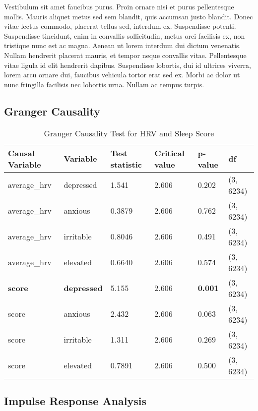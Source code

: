 \documentclass{article}
\begin{document}
Vestibulum sit amet faucibus purus. Proin ornare nisi et purus
pellentesque mollis. Mauris aliquet metus sed sem blandit, quis accumsan
justo blandit. Donec vitae lectus commodo, placerat tellus sed, interdum
ex. Suspendisse potenti. Suspendisse tincidunt, enim in convallis
sollicitudin, metus orci facilisis ex, non tristique nunc est ac magna.
Aenean ut lorem interdum dui dictum venenatis. Nullam hendrerit placerat
mauris, et tempor neque convallis vitae. Pellentesque vitae ligula id
elit hendrerit dapibus. Suspendisse lobortis, dui id ultrices viverra,
lorem arcu ornare dui, faucibus vehicula tortor erat sed ex. Morbi ac
dolor ut nunc fringilla facilisis nec lobortis urna. Nullam ac tempus
turpis.

\hypertarget{granger-causality-1}{%
\subsection{Granger Causality}\label{granger-causality-1}}

\begin{table}[!ht]
    \centering
    \begin{tabular}{llllll}
    \toprule
        \textbf{Causal Variable} & \textbf{Variable} & \textbf{Test statistic} & \textbf{Critical value} & \textbf{p-value} & \textbf{df} \\ \midrule
        average\_hrv & depressed & 1.541 & 2.606 & 0.202 & (3, 6234) \\ 
        average\_hrv & anxious & 0.3879 & 2.606 & 0.762 & (3, 6234) \\ 
        average\_hrv & irritable & 0.8046 & 2.606 & 0.491 & (3, 6234) \\ 
        average\_hrv & elevated & 0.6640 & 2.606 & 0.574 & (3, 6234) \\ 
        \textbf{score} & \textbf{depressed} & 5.155 & 2.606 & \textbf{0.001} & (3, 6234) \\ 
        score & anxious & 2.432 & 2.606 & 0.063 & (3, 6234) \\ 
        score & irritable & 1.311 & 2.606 & 0.269 & (3, 6234) \\ 
        score & elevated & 0.7891 & 2.606 & 0.500 & (3, 6234) \\ \bottomrule
    \end{tabular}
    \caption{Granger Causality Test for HRV and Sleep Score}
    \label{Granger}
\end{table}


\hypertarget{impulse-response-analysis-1}{%
\subsection{Impulse Response Analysis}\label{impulse-response-analysis-1}}
\end{document}
